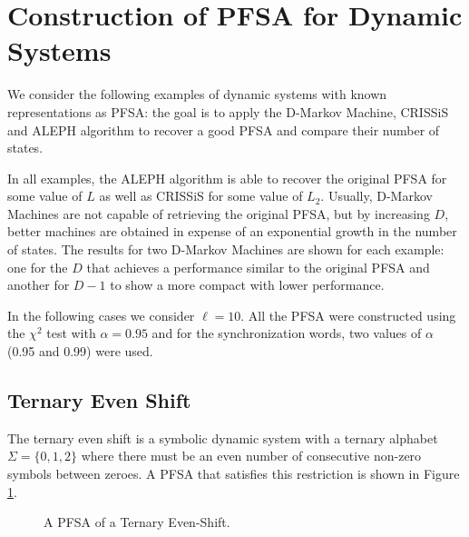 {\section{Construction of PFSA for Dynamic Systems}\label{sec:testcases}

We consider the following examples of dynamic systems with known representations as PFSA: the goal is to apply the D-Markov Machine, CRISSiS and ALEPH  algorithm to recover a good PFSA and compare their number of states.

In all examples, the ALEPH algorithm is able to recover the original PFSA for some value of $L$ as well as CRISSiS for some value of $L_2$.  Usually, D-Markov Machines are not capable of retrieving the original PFSA, but by increasing $D$, better machines are obtained in expense of an exponential growth in the number of states. The results for two D-Markov Machines are shown for each example: one for the $D$ that achieves a performance similar to the original PFSA and another for $D-1$ to show a more compact with lower performance.

In the following cases we consider $\ell=10$. All the PFSA were constructed using the $\chi^2$ test with $\alpha = 0.95$ and for the synchronization words, two values of $\alpha$ (0.95 and 0.99) were used.

\subsection{Ternary Even Shift}

The ternary even shift is a symbolic dynamic system with a ternary alphabet $\Sigma = \{0,1,2\}$ where there must be an even number of consecutive non-zero symbols between zeroes. A PFSA that satisfies this restriction is shown in Figure \ref{fig:ternaryeven}. 

\begin{figure}
\centering
{}
\caption{A PFSA of a Ternary Even-Shift.\label{fig:ternaryeven}}
\end{figure}

}

